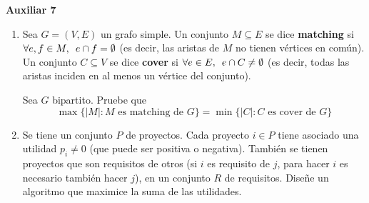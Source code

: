 

\header
\begin{center}
	\LARGE \bf{Auxiliar 7}
\end{center}

\begin{enumerate}[label ={\bf P\arabic*}]
	\item Sea $G=(V,E)$ un grafo simple. Un conjunto $M\subseteq E$ se dice \textbf{matching} si $\forall e,f \in M, \hspace{0.5em}e\cap f = \emptyset$ (es decir, las aristas de $M$ no tienen vértices en común). Un conjunto $C\subseteq V$ se dice \textbf{cover} si $\forall e \in E,\hspace{0.5em} e\cap C \neq \emptyset$ (es decir, todas las aristas inciden en al menos un vértice del conjunto).
        
        Sea $G$ bipartito. Pruebe que \begin{equation*}
            \max \{|M| : M\text{ es matching de }G\}=\min\{|C|: C\text{ es cover de }G\}
        \end{equation*}

    \item Se tiene un conjunto $P$ de proyectos. Cada proyecto $i\in P$ tiene asociado una utilidad $p_i\neq 0$ (que puede ser positiva o negativa). También se tienen proyectos que son requisitos de otros (si $i$ es requisito de $j$, para hacer $i$ es necesario también hacer $j$), en un conjunto $R$ de requisitos. Diseñe un algoritmo que maximice la suma de las utilidades.
\end{enumerate}
